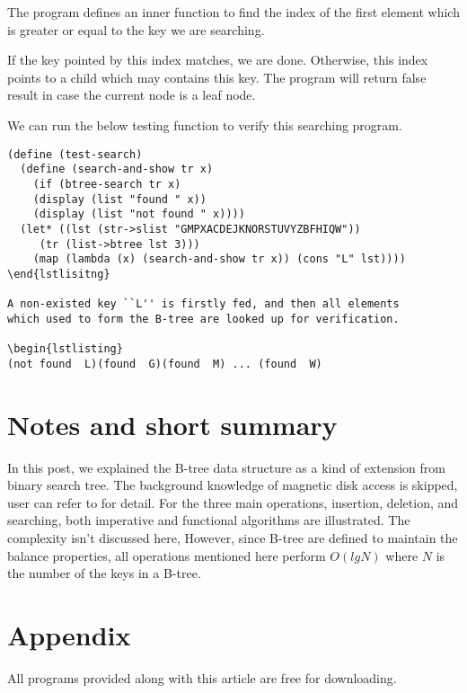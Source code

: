 \documentclass{article}
\begin{document}
The program defines an inner function to find the index of the
first element which is greater or equal to the key we are searching.

If the key pointed by this index matches, we are done. Otherwise,
this index points to a child which may contains this key. The program
will return false result in case the current node is a leaf node.

We can run the below testing function to verify this searching
program.

\begin{lstlisting}
(define (test-search)
  (define (search-and-show tr x)
    (if (btree-search tr x)
	(display (list "found " x))
	(display (list "not found " x))))
  (let* ((lst (str->slist "GMPXACDEJKNORSTUVYZBFHIQW"))
	 (tr (list->btree lst 3)))
    (map (lambda (x) (search-and-show tr x)) (cons "L" lst))))
\end{lstlisitng}

A non-existed key ``L'' is firstly fed, and then all elements
which used to form the B-tree are looked up for verification.

\begin{lstlisting}
(not found  L)(found  G)(found  M) ... (found  W)
\end{lstlisting}

\section{Notes and short summary}
In this post, we explained the B-tree data structure as a kind of
extension from binary search tree. The background knowledge of
magnetic disk access is skipped, user can refer to \cite{CLRS}
for detail. For the three main operations, insertion, deletion,
and searching, both imperative and functional algorithms are
illustrated. The complexity isn't discussed here, However, since
B-tree are defined to maintain the balance properties, all operations
mentioned here perform $O(lgN)$ where $N$ is the number of the
keys in a B-tree.


\section{Appendix} \label{appendix}
All programs provided along with this article are free for
downloading.
\end{document}
